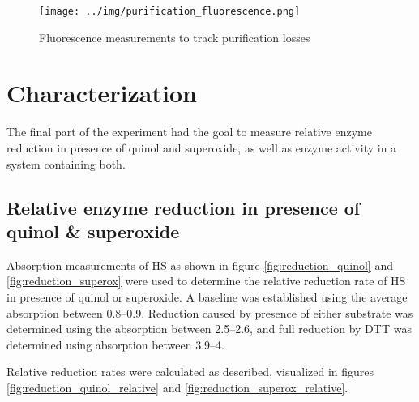 \begin{figure}
	\centering
	\texttt{[image: ../img/purification\_fluorescence.png]}
	\caption{Fluorescence measurements to track purification losses}
	\label{fig:purification_fluorescence}
\end{figure}

\section{Characterization}

The final part of the experiment had the goal to measure relative enzyme
reduction in presence of quinol and superoxide, as well as enzyme activity in a
system containing both.

\subsection{Relative enzyme reduction in presence of quinol \& superoxide}

Absorption measurements of HS as shown in figure \ref{fig:reduction_quinol} and
\ref{fig:reduction_superox} were used to determine the relative reduction
rate of HS in presence of quinol or superoxide. A baseline was established
using the average absorption between \SIrange{0.8}{0.9}{\min}. Reduction caused
by presence of either substrate was determined using the absorption between
\SIrange{2.5}{2.6}{\min}, and full reduction by DTT was determined using
absorption between \SIrange{3.9}{4}{\min}.

Relative reduction rates were calculated as described, visualized in figures
\ref{fig:reduction_quinol_relative} and \ref{fig:reduction_superox_relative}. 

